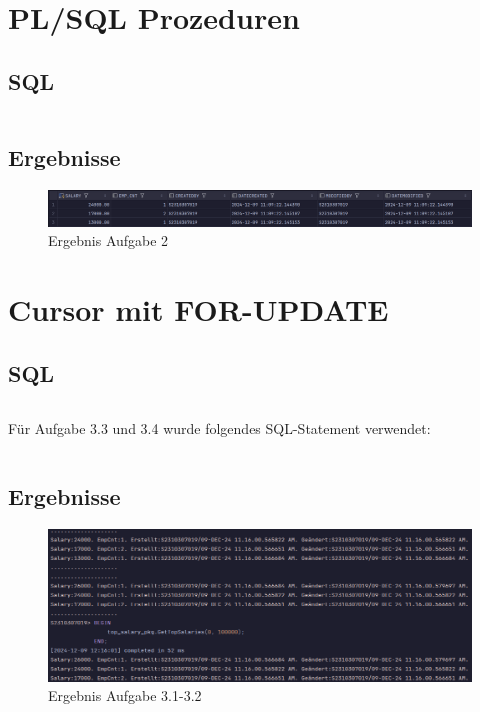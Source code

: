 \documentclass[12pt]{scrartcl}
\begin{document}
\pagebreak

\section{PL/SQL Prozeduren}

\subsection{SQL}
\inputminted{sql}{../ue4_2.sql}

\subsection{Ergebnisse}
\begin{figure}[h]
	\centering
	\includegraphics[width=1\textwidth]{../ue4_2.png}
	\caption{Ergebnis Aufgabe 2}
\end{figure}

\section{Cursor mit FOR-UPDATE}

\subsection{SQL}
\inputminted{sql}{../ue4_3.sql}

Für Aufgabe 3.3 und 3.4 wurde folgendes SQL-Statement verwendet:

\inputminted{sql}{../ue4_3_3.sql}

\pagebreak

\subsection{Ergebnisse}
\begin{figure}[h]
	\centering
	\includegraphics[width=1\textwidth]{../ue4_3_1.png}
	\caption{Ergebnis Aufgabe 3.1-3.2}
\end{figure}
\end{document}
